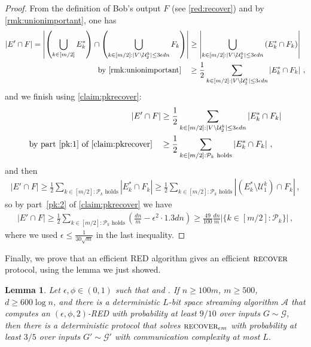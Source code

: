 \documentclass[epsfig,letter,11pt]{article}
\numberwithin{equation}{section}
\DeclareMathOperator*{\recover}{\textsc{recover}}
\newtheorem{lemma}[theorem]{Lemma}
\begin{document}
\begin{proof}
	\noindent
	From the definition of Bob's output $F$ (see \cref{red:recover}) and by \cref{rmk:unionimportant}, one has
	\begin{align*}
		|E' \cap F|  = \left| \left(\bigcup_{k \in [m/2]} E_k^*\right) \cap  \left(\bigcup_{k \in [m/2] : |V \setminus \mathcal{U}_2^k| \le 3\epsilon dn} F_k \right) \right|
		& \ge \left| \bigcup_{k\in [m/2] : |V \setminus \mathcal{U}_2^k| \le 3\epsilon dn}  \left( E_k^* \cap  F_k \right) \right| \\
		\text{by \cref{rmk:unionimportant}} \quad & \ge \frac{1}{2} \sum_{k\in [m/2] : |V \setminus \mathcal{U}_2^k| \le 3\epsilon dn}  \left| E_k^* \cap  F_k \right| \, ,
	\end{align*}
	and we finish using \cref{claim:pkrecover}:
	\begin{align*}
		|E' \cap F|  & \ge \frac{1}{2} \sum_{k\in [m/2] : |V \setminus \mathcal{U}_2^k| \le 3\epsilon dn}  \left| E_k^* \cap  F_k \right|  \\
		\text{by part~\eqref{pk:1} of \cref{claim:pkrecover}} \quad & \ge  \frac{1}{2} \sum_{k\in [m/2] : \mathcal{P}_k  \text{ holds}}  \left| E_k^* \cap  F_k \right| \, ,
	\end{align*}
	and then
		\begin{align*}
		|E' \cap F|  \ge  \frac{1}{2} \sum_{k\in [m/2] : \mathcal{P}_k  \text{ holds}}  \left| E_k^* \cap  F_k \right|  \ge  \frac{1}{2} \sum_{k\in [m/2] : \mathcal{P}_k \text{ holds}}  \left| (E^*_k \setminus \mathcal{U}^k_1) \cap F_k\right| \, , 
	\end{align*}
	so by part~\eqref{pk:2} of \cref{claim:pkrecover} we have
	\begin{align*}
		|E' \cap F|  \ge \frac{1}{2} \sum_{k\in [m/2] : \mathcal{P}_k  \text{ holds}} \left(\frac{dn}{m} -\epsilon^2 \cdot 1.3 dn\right)   \ge \frac{49}{100} \frac{dn}{m}  |\{k\in [m/2] : \mathcal{P}_k\}| \, ,
	\end{align*}
	where we used $\epsilon \le \frac{1}{30\sqrt{m}}$ in the last inequality.
\end{proof}
\noindent
Finally, we prove that an efficient RED algorithm gives an efficient $\recover$ protocol, using the lemma we just showed.
\begin{lemma} \label{lem:ind-recover}
	Let $\epsilon,\phi \in (0,1)$ such that  and . If $n \ge 100 m$, $m\ge 500$, $d \ge 600 \log n$, and there is a deterministic $L$-bit space streaming algorithm $\mathcal{A}$ that computes an $(\epsilon,\phi,2)$-RED with probability at least $9/10$ over inputs $G  \sim \mathcal{G}$, then there is a deterministic protocol that solves $\recover_{\epsilon m}$ with probability at least $3/5$ over inputs $G' \sim \mathcal{G}'$ with communication complexity at most $L$.
\end{lemma}
\end{document}
